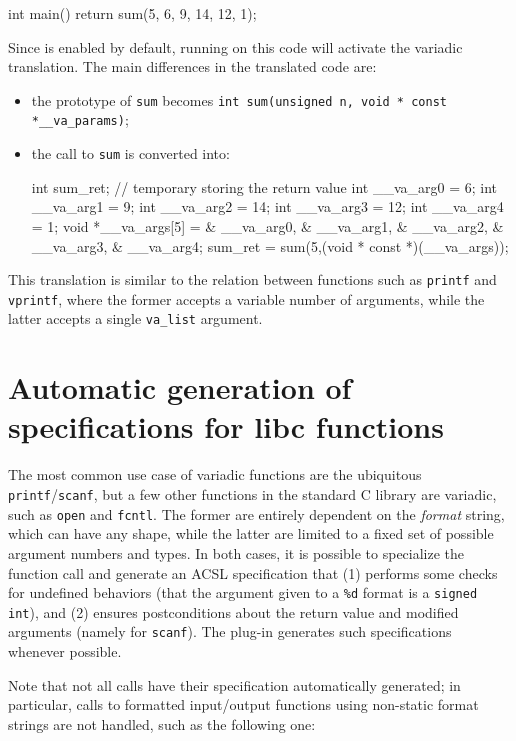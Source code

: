 \begin{ccode}
int main(){
  return sum(5, 6, 9, 14, 12, 1);
}
\end{ccode}

Since  is enabled by default, running \FramaC on this code
will activate the variadic translation. The main differences in the translated
code are:

\begin{itemize}
\item the prototype of \verb+sum+ becomes
  \verb+int sum(unsigned n, void * const *__va_params)+;
\item the call to \verb+sum+ is converted into:
  \begin{ccode}
  int sum_ret; // temporary storing the return value
  {
    int __va_arg0 = 6;
    int __va_arg1 = 9;
    int __va_arg2 = 14;
    int __va_arg3 = 12;
    int __va_arg4 = 1;
    void *__va_args[5] = {& __va_arg0, & __va_arg1,
                            & __va_arg2, & __va_arg3, & __va_arg4};
    sum_ret = sum(5,(void * const *)(__va_args));
  }
  \end{ccode}
\end{itemize}

This translation is similar to the relation between functions such as
\verb+printf+ and \verb+vprintf+, where the former accepts a variable number of
arguments, while the latter accepts a single \verb+va_list+ argument.

\section{Automatic generation of specifications for libc functions}

The most common use case of variadic functions are the ubiquitous
\verb+printf+/\verb+scanf+, but a few other functions in the standard
C library are variadic, such as \verb+open+ and \verb+fcntl+.
The former are entirely dependent on the {\em format} string, which can have
any shape, while the latter are limited to a fixed set of possible argument
numbers and types. In both cases, it is possible to specialize the function
call and generate an ACSL specification that (1) performs some checks for
undefined behaviors (\eg that the argument given to a \verb+%d+ format is a
\verb+signed int+), and (2) ensures postconditions about the return value
and modified arguments (namely for \verb+scanf+). The 
plug-in generates such specifications whenever possible.

Note that not all calls have their specification automatically generated;
in particular, calls to formatted input/output functions using non-static
format strings are not handled, such as the following one:

